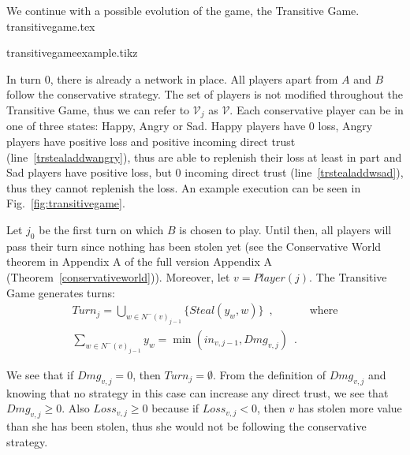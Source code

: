   We continue with a possible evolution of the game, the Transitive Game.
  {transitivegame.tex}

  {transitivegameexample.tikz}

  \noindent In turn 0, there is already a network in place. All players apart from $A$ and $B$ follow the conservative
  strategy. The set of players is not modified throughout the Transitive Game, thus we can refer to $\mathcal{V}_j$ as
  $\mathcal{V}$. Each conservative player can be in one of three states: Happy, Angry or Sad. Happy players have 0 loss, Angry
  players have positive loss and positive incoming direct trust (line~\ref{trstealaddwangry}), thus are able to replenish
  their loss at least in part and Sad players have positive loss, but 0 incoming direct trust (line~\ref{trstealaddwsad}),
  thus they cannot replenish the loss. An example execution can be seen in Fig.~\ref{fig:transitivegame}.

  Let $j_0$ be the first turn on which $B$ is chosen to play. Until then, all players will pass their turn since nothing has
  been stolen yet (see \ifdefined\proceedings the Conservative World theorem in Appendix A of the full version
  \cite{trustisrisk}\else Appendix A (Theorem~\ref{conservativeworld})\fi). Moreover, let $v = Player(j)$. The Transitive Game
  generates turns:
  \begin{align}
     Turn_j = \bigcup\limits_{w \in N^{-}\left(v\right)_{j-1}}\{Steal\left(y_w,w\right)\} \enspace, & \mbox{ where} \\
     \sum\limits_{w \in N^{-}\left(v\right)_{j-1}}y_w = \min\left(in_{v, j-1}, Dmg_{v, j}\right) \enspace. &
  \end{align}

  \noindent We see that if $Dmg_{v, j} = 0$, then $Turn_j = \emptyset$. From the definition of $Dmg_{v,j}$ and knowing that no
  strategy in this case can increase any direct trust, we see that $Dmg_{v,j} \geq 0$. Also $Loss_{v,j} \geq 0$ because
  if $Loss_{v,j} < 0$, then $v$ has stolen more value than she has been stolen, thus she would not be following the
  conservative strategy.
